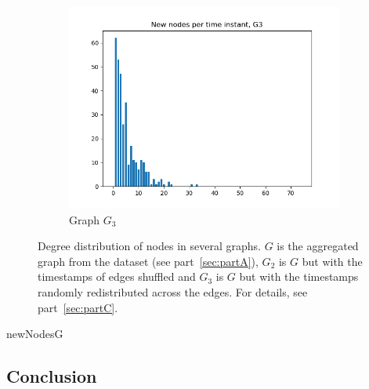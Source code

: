 \documentclass[letterpaper]{article}
\begin{document}
\begin{figure}
\begin{subfigure}[b]{0.32\textwidth}
        \includegraphics[width=\textwidth]{img/newNodesG3.png}
        \caption{Graph \(G_3\)}
	    \label{fig:degree_distribution_G3}
    \end{subfigure}
    \caption{Degree distribution of nodes in several graphs. \(G\) is the aggregated graph from the dataset (see part~\ref{sec:partA}), \(G_2\) is \(G\) but with the timestamps of edges shuffled and \(G_3\) is \(G\) but with the timestamps randomly redistributed across the edges. For details, see part~\ref{sec:partC}.}
    \label{fig:degree_distribution}
\end{figure}

newNodesG


\subsection*{Conclusion}
\todo{}
\end{document}
